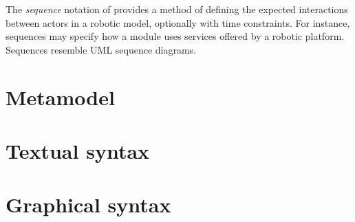 
The \emph{sequence} notation of \langname{} provides a method of
defining the expected interactions between actors in a robotic model,
optionally with time constraints.  For instance, sequences may specify
how a \robochart{} module uses services offered by a robotic platform.
Sequences resemble UML sequence diagrams.

\chapter{Metamodel}\label{cha:metamodel}


\chapter{Textual syntax}\label{cha:textual}


\chapter{Graphical syntax}\label{cha:graphical}


